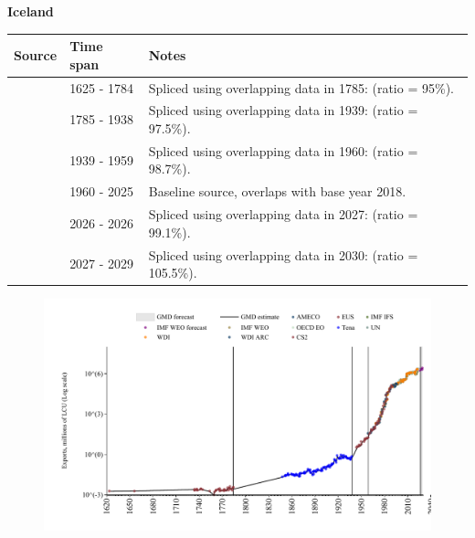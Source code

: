 \documentclass[12pt,a4paper,landscape]{article}
\begin{document}
\begin{adjustbox}{max totalsize={\paperwidth}{\paperheight},center}
\begin{minipage}[t][\textheight][t]{\textwidth}
\vspace*{0.5cm}
{}
\begin{center}
{\Large\bfseries Iceland}
\end{center}
\vspace{0.5cm}
\begin{table}[H]
\centering
\small
\begin{tabular}{|l|l|l|}
\hline
\textbf{Source} & \textbf{Time span} & \textbf{Notes} \\
\hline
\rowcolor{white}\cite{CS2_ISL}& 1625 - 1784 &Spliced using overlapping data in 1785: (ratio = 95\%).\\
\rowcolor{lightgray}\cite{Tena}& 1785 - 1938 &Spliced using overlapping data in 1939: (ratio = 97.5\%).\\
\rowcolor{white}\cite{CS2_ISL}& 1939 - 1959 &Spliced using overlapping data in 1960: (ratio = 98.7\%).\\
\rowcolor{lightgray}\cite{OECD_EO}& 1960 - 2025 &Baseline source, overlaps with base year 2018.\\
\rowcolor{white}\cite{AMECO}& 2026 - 2026 &Spliced using overlapping data in 2027: (ratio = 99.1\%).\\
\rowcolor{lightgray}\cite{IMF_WEO_forecast}& 2027 - 2029 &Spliced using overlapping data in 2030: (ratio = 105.5\%).\\
\hline
\end{tabular}
\end{table}
\begin{figure}[H]
\centering
\includegraphics[width=\textwidth,height=0.6\textheight,keepaspectratio]{graphs/ISL_exports.pdf}
\end{figure}
\end{minipage}
\end{adjustbox}
\end{document}
